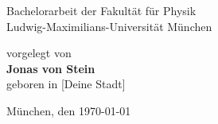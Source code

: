 \documentclass[a4paper,11pt,twoside,openright]{report}
\newcommand{\authorname}{Jonas von Stein}
\newcommand{\thesisdate}{\today}
\begin{document}
\begin{titlepage}
\begin{center}
    \vspace*{0.5cm}
    \Large
    Bachelorarbeit der Fakultät für Physik\\
    Ludwig-Maximilians-Universität München

    \vspace*{3.5cm}
    \large
    vorgelegt von\\[0.1cm]
    \Large \textbf{\authorname}\\
    \large geboren in [Deine Stadt] %

    \vspace*{2.5cm}
    München, den \thesisdate
  \end{center}
\end{titlepage}


\cleardoublepage
{}
\tableofcontents
\clearpage


\pagestyle{fancy}
\fancyhf{} %


\lhead[\fancyplain{}{\thepage}]{\fancyplain{}{\rightmark}}

\rhead[\fancyplain{}{\leftmark}]{\fancyplain{}{\thepage}}

\cfoot{}



\clearpage{\pagestyle{empty}\cleardoublepage}


\clearpage{\pagestyle{empty}\cleardoublepage}


\clearpage{\pagestyle{empty}\cleardoublepage}


\clearpage{\pagestyle{empty}\cleardoublepage}


\clearpage{\pagestyle{empty}\cleardoublepage}


\clearpage{\pagestyle{empty}\cleardoublepage}


\clearpage{\pagestyle{empty}\cleardoublepage}


\clearpage


\cleardoublepage
{}


\end{document}
